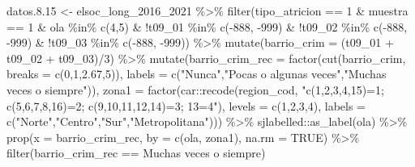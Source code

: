 \documentclass[
  12pt,
]{book}
\newenvironment{Shaded}{\begin{snugshade}}{\end{snugshade}}
\newcommand{\AttributeTok}[1]{\textcolor[rgb]{0.77,0.63,0.00}{#1}}
\newcommand{\ConstantTok}[1]{\textcolor[rgb]{0.00,0.00,0.00}{#1}}
\newcommand{\DecValTok}[1]{\textcolor[rgb]{0.00,0.00,0.81}{#1}}
\newcommand{\FloatTok}[1]{\textcolor[rgb]{0.00,0.00,0.81}{#1}}
\newcommand{\FunctionTok}[1]{\textcolor[rgb]{0.00,0.00,0.00}{#1}}
\newcommand{\NormalTok}[1]{#1}
\newcommand{\OtherTok}[1]{\textcolor[rgb]{0.56,0.35,0.01}{#1}}
\newcommand{\SpecialCharTok}[1]{\textcolor[rgb]{0.00,0.00,0.00}{#1}}
\newcommand{\StringTok}[1]{\textcolor[rgb]{0.31,0.60,0.02}{#1}}
\begin{document}
\begin{Shaded}
\begin{Highlighting}[]
\NormalTok{datos.}\FloatTok{8.15} \OtherTok{\textless{}{-}}\NormalTok{ elsoc\_long\_2016\_2021 }\SpecialCharTok{\%\textgreater{}\%} 
  \FunctionTok{filter}\NormalTok{(tipo\_atricion }\SpecialCharTok{==} \DecValTok{1} \SpecialCharTok{\&}\NormalTok{ muestra }\SpecialCharTok{==} \DecValTok{1} \SpecialCharTok{\&}\NormalTok{ ola }\SpecialCharTok{\%in\%} \FunctionTok{c}\NormalTok{(}\DecValTok{4}\NormalTok{,}\DecValTok{5}\NormalTok{) }\SpecialCharTok{\&}
           \SpecialCharTok{!}\NormalTok{t09\_01 }\SpecialCharTok{\%in\%} \FunctionTok{c}\NormalTok{(}\SpecialCharTok{{-}}\DecValTok{888}\NormalTok{, }\SpecialCharTok{{-}}\DecValTok{999}\NormalTok{) }\SpecialCharTok{\&} \SpecialCharTok{!}\NormalTok{t09\_02 }\SpecialCharTok{\%in\%} \FunctionTok{c}\NormalTok{(}\SpecialCharTok{{-}}\DecValTok{888}\NormalTok{, }\SpecialCharTok{{-}}\DecValTok{999}\NormalTok{) }\SpecialCharTok{\&} \SpecialCharTok{!}\NormalTok{t09\_03 }\SpecialCharTok{\%in\%} \FunctionTok{c}\NormalTok{(}\SpecialCharTok{{-}}\DecValTok{888}\NormalTok{, }\SpecialCharTok{{-}}\DecValTok{999}\NormalTok{)) }\SpecialCharTok{\%\textgreater{}\%} 
  \FunctionTok{mutate}\NormalTok{(}\AttributeTok{barrio\_crim =}\NormalTok{ (t09\_01 }\SpecialCharTok{+}\NormalTok{ t09\_02 }\SpecialCharTok{+}\NormalTok{ t09\_03)}\SpecialCharTok{/}\DecValTok{3}\NormalTok{) }\SpecialCharTok{\%\textgreater{}\%} 
  \FunctionTok{mutate}\NormalTok{(}\AttributeTok{barrio\_crim\_rec =} \FunctionTok{factor}\NormalTok{(}\FunctionTok{cut}\NormalTok{(barrio\_crim, }\AttributeTok{breaks =} \FunctionTok{c}\NormalTok{(}\DecValTok{0}\NormalTok{,}\DecValTok{1}\NormalTok{,}\FloatTok{2.67}\NormalTok{,}\DecValTok{5}\NormalTok{)),}
                                  \AttributeTok{labels =} \FunctionTok{c}\NormalTok{(}\StringTok{"Nunca"}\NormalTok{,}\StringTok{"Pocas o algunas veces"}\NormalTok{,}\StringTok{"Muchas veces o siempre"}\NormalTok{)),}
         \AttributeTok{zona1 =} \FunctionTok{factor}\NormalTok{(car}\SpecialCharTok{::}\FunctionTok{recode}\NormalTok{(region\_cod, }\StringTok{"c(1,2,3,4,15)=1; c(5,6,7,8,16)=2; c(9,10,11,12,14)=3; 13=4"}\NormalTok{),}
                        \AttributeTok{levels =} \FunctionTok{c}\NormalTok{(}\DecValTok{1}\NormalTok{,}\DecValTok{2}\NormalTok{,}\DecValTok{3}\NormalTok{,}\DecValTok{4}\NormalTok{), }\AttributeTok{labels =} \FunctionTok{c}\NormalTok{(}\StringTok{"Norte"}\NormalTok{,}\StringTok{"Centro"}\NormalTok{,}\StringTok{"Sur"}\NormalTok{,}\StringTok{"Metropolitana"}\NormalTok{))) }\SpecialCharTok{\%\textgreater{}\%}
\NormalTok{  sjlabelled}\SpecialCharTok{::}\FunctionTok{as\_label}\NormalTok{(ola) }\SpecialCharTok{\%\textgreater{}\%} 
  \FunctionTok{prop}\NormalTok{(}\AttributeTok{x =}\NormalTok{ barrio\_crim\_rec, }\AttributeTok{by =} \FunctionTok{c}\NormalTok{(ola, zona1), }\AttributeTok{na.rm =} \ConstantTok{TRUE}\NormalTok{) }\SpecialCharTok{\%\textgreater{}\%} 
  \FunctionTok{filter}\NormalTok{(barrio\_crim\_rec }\SpecialCharTok{==} \StringTok{\textquotesingle{}Muchas veces o siempre\textquotesingle{}}\NormalTok{)}


\end{Highlighting}
\end{Shaded}
\end{document}
